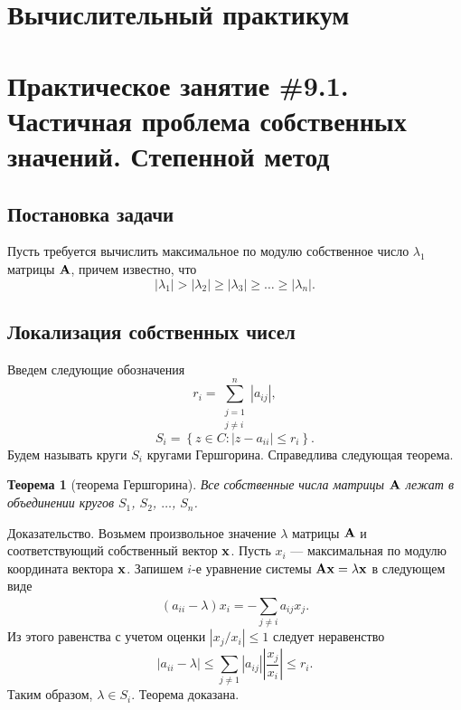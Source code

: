 \documentclass[12pt]{article}
\newtheorem{theorem}{Теорема}
\begin{document}
    \begin{flushright}
	\end{flushright}
	\begin{flushright}
	\end{flushright}
    \section*{Вычислительный практикум}
    \section*{Практическое занятие \#9.1. Частичная проблема собственных значений. Степенной метод}

	\subsection*{Постановка задачи}
	
	Пусть требуется вычислить максимальное по модулю собственное число $\lambda_1$ матрицы $\bold{A}$, причем известно, что
	\begin{equation}
		\left|\lambda_1\right|>\left|\lambda_2\right|\geqslant\left|\lambda_3\right|\geqslant\ldots\geqslant\left|\lambda_n\right|.\label{fm0}
	\end{equation}
	
	\subsection*{Локализация собственных чисел}
	
	Введем следующие обозначения 
	\begin{equation}
		r_i=\sum_{\substack{j=1\\j\neq i}}^{n}\left|a_{ij}\right|,
	\end{equation}
	\begin{equation}
		S_i=\left\{z\in C : \left|z-a_{ii}\right|\leqslant r_i \right\}.
	\end{equation}
	Будем называть круги $S_i$ кругами Гершгорина. Справедлива следующая теорема.	
	\begin{theorem}[теорема Гершгорина]
		Все собственные числа матрицы $\bold{A}$ лежат в объединении кругов $S_1$, $S_2$, $\ldots$, $S_n$.
	\end{theorem}
	Доказательство. Возьмем произвольное значение $\lambda$ матрицы $\bold{A}$ и соответствующий собственный вектор $\bold{x}$. Пусть $x_i$ --- максимальная по модулю координата вектора $\bold{x}$. Запишем $i$-е уравнение системы $\bold{Ax}=\lambda\bold{x}$ в следующем виде
	\begin{equation}
		(a_{ii}-\lambda)x_i=-\sum_{j\neq i}^{}a_{ij}x_j.
	\end{equation}
	Из этого равенства с учетом оценки $\left|x_j/x_i\right|\leqslant 1$ следует неравенство
	\begin{equation}
		\left|a_{ii}-\lambda\right|\leqslant\sum_{j\neq 1}\left|a_{ij}\right|\left|\frac{x_j}{x_i}\right|\leqslant r_i.
	\end{equation}
	Таким образом, $\lambda\in S_i$. Теорема доказана.
	
\end{document}
